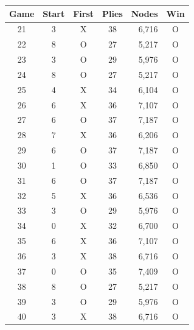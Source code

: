 \begin{tabular}{ccccrc}
\toprule
Game & Start & First & Plies & Nodes & Win \\
\midrule
21 & 3 & X & 38 & 6,716 & O \\
22 & 8 & O & 27 & 5,217 & O \\
23 & 3 & O & 29 & 5,976 & O \\
24 & 8 & O & 27 & 5,217 & O \\
25 & 4 & X & 34 & 6,104 & O \\
26 & 6 & X & 36 & 7,107 & O \\
27 & 6 & O & 37 & 7,187 & O \\
28 & 7 & X & 36 & 6,206 & O \\
29 & 6 & O & 37 & 7,187 & O \\
30 & 1 & O & 33 & 6,850 & O \\
31 & 6 & O & 37 & 7,187 & O \\
32 & 5 & X & 36 & 6,536 & O \\
33 & 3 & O & 29 & 5,976 & O \\
34 & 0 & X & 32 & 6,700 & O \\
35 & 6 & X & 36 & 7,107 & O \\
36 & 3 & X & 38 & 6,716 & O \\
37 & 0 & O & 35 & 7,409 & O \\
38 & 8 & O & 27 & 5,217 & O \\
39 & 3 & O & 29 & 5,976 & O \\
40 & 3 & X & 38 & 6,716 & O \\
\bottomrule
\end{tabular}
